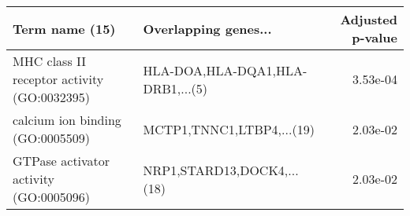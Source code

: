 \begin{tabular}{llr}
\toprule
                             Term name (15) &             Overlapping genes... &  Adjusted p-value \\
\midrule
MHC class II receptor activity (GO:0032395) & HLA-DOA,HLA-DQA1,HLA-DRB1,...(5) &          3.53e-04 \\
           calcium ion binding (GO:0005509) &        MCTP1,TNNC1,LTBP4,...(19) &          2.03e-02 \\
     GTPase activator activity (GO:0005096) &       NRP1,STARD13,DOCK4,...(18) &          2.03e-02 \\
\bottomrule
\end{tabular}
